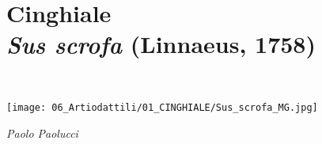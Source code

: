 \pagestyle{ATLASpage}

\chapter[Cinghiale - \textit{Sus scrofa} (Linnaeus, 1758)]{\textbf{Cinghiale}  \\[2pt] {\LARGE\textit{Sus scrofa} (Linnaeus, 1758)}}
\vspace{5pt}\\

\begin{center}
	\texttt{[image: 06\_Artiodattili/01\_CINGHIALE/Sus\_scrofa\_MG.jpg]}
\end{center}
{\hspace*{\fill}\footnotesize\itshape Paolo Paolucci}
